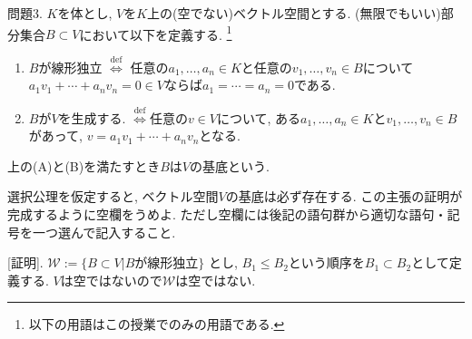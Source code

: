 \documentclass[dvipdfmx,a4paper,11pt]{article}
\theoremstyle{definition}
\begin{document}

  
問題3. $K$を体とし, $V$を$K$上の(空でない)ベクトル空間とする. 
(無限でもいい)部分集合$B \subset V$において以下を定義する. \footnote{以下の用語はこの授業でのみの用語である.}
  \begin{enumerate}[label=(\Alph*).]
 \setlength{\parskip}{0cm}
  \setlength{\itemsep}{0pt}
  \item $B$が線形独立 $\stackrel{\mathrm{def}}{\Longleftrightarrow}$ 任意の$a_1,\ldots, a_n \in K$と任意の$v_1, \ldots, v_n \in B$について$a_1 v_1 + \cdots + a_n v_n=0  \in V$ならば$a_1 = \cdots = a_n=0$である.
  \item $B$が$V$を生成する.  $\stackrel{\mathrm{def}}{\Longleftrightarrow}$任意の$v \in V$について, ある$a_1,\ldots, a_n \in K$と$v_1, \ldots, v_n \in B$があって, $v = a_1 v_1 + \cdots + a_n v_n$となる. 
  \end{enumerate}
上の(A)と(B)を満たすとき$B$は$V$の基底という. 

選択公理を仮定すると, ベクトル空間$V$の基底は必ず存在する. この主張の証明が完成するように空欄をうめよ. ただし空欄には後記の語句群から適切な語句・記号を一つ選んで記入すること.

[証明]. $\mathcal{W} := \{ B \subset V | \text{$B$が線形独立}\}$
とし, $B_1 \le B_2$という順序を$B_1 \subset B_2$として定義する.
$V$は空ではないので$\mathcal{W}$は空ではない. 
\end{document}
